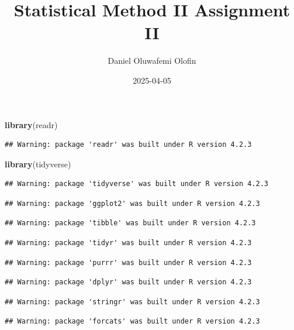 \documentclass[
]{article}
\title{Statistical Method II Assignment II}
\author{Daniel Oluwafemi Olofin}
\date{2025-04-05}
\newenvironment{Shaded}{\begin{snugshade}}{\end{snugshade}}
\newcommand{\FunctionTok}[1]{\textcolor[rgb]{0.13,0.29,0.53}{\textbf{#1}}}
\newcommand{\NormalTok}[1]{#1}
\begin{document}
\maketitle

\begin{Shaded}
\begin{Highlighting}[]
\FunctionTok{library}\NormalTok{(readr)}
\end{Highlighting}
\end{Shaded}

\begin{verbatim}
## Warning: package 'readr' was built under R version 4.2.3
\end{verbatim}

\begin{Shaded}
\begin{Highlighting}[]
\FunctionTok{library}\NormalTok{(tidyverse)}
\end{Highlighting}
\end{Shaded}

\begin{verbatim}
## Warning: package 'tidyverse' was built under R version 4.2.3
\end{verbatim}

\begin{verbatim}
## Warning: package 'ggplot2' was built under R version 4.2.3
\end{verbatim}

\begin{verbatim}
## Warning: package 'tibble' was built under R version 4.2.3
\end{verbatim}

\begin{verbatim}
## Warning: package 'tidyr' was built under R version 4.2.3
\end{verbatim}

\begin{verbatim}
## Warning: package 'purrr' was built under R version 4.2.3
\end{verbatim}

\begin{verbatim}
## Warning: package 'dplyr' was built under R version 4.2.3
\end{verbatim}

\begin{verbatim}
## Warning: package 'stringr' was built under R version 4.2.3
\end{verbatim}

\begin{verbatim}
## Warning: package 'forcats' was built under R version 4.2.3
\end{verbatim}
\end{document}
